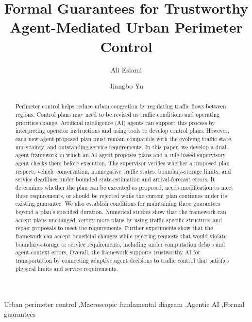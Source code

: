 \documentclass[preprint,12pt]{elsarticle}
\theoremstyle{definition}
\theoremstyle{plain}
\theoremstyle{definition}
\theoremstyle{plain}
\begin{document}
\begin{frontmatter}
\title{Formal Guarantees for Trustworthy Agent-Mediated Urban Perimeter Control}
\author[mcgill]{Ali Eslami}
\author[mcgill]{Jiangbo Yu}
\begin{abstract}\fontsize{11}{13}\selectfont
Perimeter control helps reduce urban congestion by regulating traffic flows
between regions. Control plans may need to be revised as traffic conditions
and operating priorities change. Artificial intelligence (AI) agents can
support this process by interpreting operator instructions and using tools
to develop control plans. However, each new agent-proposed plan must remain
compatible with the evolving traffic state, uncertainty, and outstanding
service requirements. In this paper, we develop a dual-agent framework in
which an AI agent proposes plans and a rule-based supervisory agent checks
them before execution. The supervisor verifies whether a proposed plan
respects vehicle conservation, nonnegative traffic states, boundary-storage
limits, and service deadlines under bounded state-estimation and
arrival-forecast errors. It determines whether the plan can be executed as
proposed, needs modification to meet these requirements, or should be
rejected while the current plan continues under its existing guarantee.
We also establish conditions for maintaining these guarantees beyond a
plan's specified duration. Numerical studies show that the framework can
accept plans unchanged, certify more plans by using traffic-specific
structure, and repair proposals to meet the requirements. Further
experiments show that the framework
can accept beneficial changes while rejecting requests that would violate
boundary-storage or service requirements, including under computation
delays and agent-context errors. Overall, the framework supports
trustworthy AI for transportation by connecting adaptive agent decisions
to traffic control that satisfies physical limits and service requirements.
\end{abstract}
\begin{keyword}
Urban perimeter control \sep Macroscopic fundamental diagram \sep Agentic AI \sep Formal guarantees
\end{keyword}
\end{frontmatter}
\end{document}
